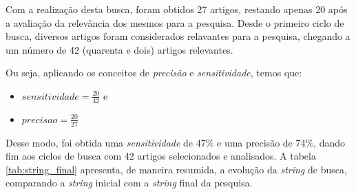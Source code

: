 		Com a realização desta busca, foram obtidos 27 artigos, restando apenas 20 após a avaliação da relevância dos mesmos para a pesquisa. Desde o primeiro ciclo de busca, diversos artigos foram considerados relavantes para a pesquisa, chegando a um número de 42 (quarenta e dois) artigos relevantes.
		
		Ou seja, aplicando os conceitos de \textit{precisão} e \textit{sensitividade}, temos que:

		\begin{itemize}
			\item $sensitividade = \frac{20}{42}$ e
			\item $precisao = \frac{20}{27}$
		\end{itemize}

		Desse modo, foi obtida uma \textit{sensitividade} de 47\% e uma precisão de 74\%, dando fim aos ciclos de busca com 42 artigos selecionados e analisados. A tabela \ref{tab:string_final} apresenta, de maneira resumida, a evolução da \textit{string} de busca, comparando a \textit{string} inicial com a \textit{string} final da pesquisa.

